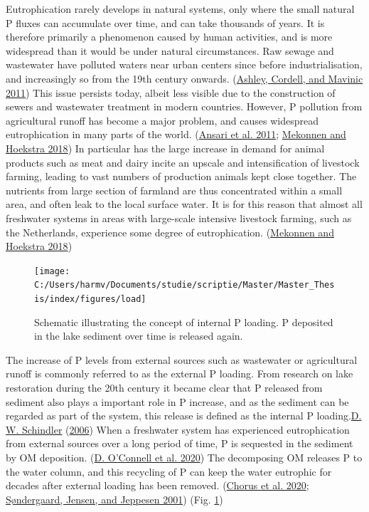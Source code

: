 \documentclass[a4paper,11pt]{article}
\begin{document}
Eutrophication rarely develops in natural systems, only where the small natural P fluxes can accumulate over time, and can take thousands of years. It is therefore primarily a phenomenon caused by human activities, and is more widespread than it would be under natural circumstances. Raw sewage and wastewater have polluted waters near urban centers since before industrialisation, and increasingly so from the 19th century onwards. (\protect\hyperlink{ref-ashleyBriefHistoryPhosphorus2011}{Ashley, Cordell, and Mavinic 2011}) This issue persists today, albeit less visible due to the construction of sewers and wastewater treatment in modern countries. However, P pollution from agricultural runoff has become a major problem, and causes widespread eutrophication in many parts of the world. (\protect\hyperlink{ref-ansariEutrophicationCausesConsequences2011}{Ansari et al. 2011}; \protect\hyperlink{ref-mekonnenGlobalAnthropogenicPhosphorus2018}{Mekonnen and Hoekstra 2018}) In particular has the large increase in demand for animal products such as meat and dairy incite an upscale and intensification of livestock farming, leading to vast numbers of production animals kept close together. The nutrients from large section of farmland are thus concentrated within a small area, and often leak to the local surface water. It is for this reason that almost all freshwater systems in areas with large-scale intensive livestock farming, such as the Netherlands, experience some degree of eutrophication. (\protect\hyperlink{ref-mekonnenGlobalAnthropogenicPhosphorus2018}{Mekonnen and Hoekstra 2018})
\begin{figure}

{\centering \texttt{[image: C:/Users/harmv/Documents/studie/scriptie/Master/Master\_Thesis/index/figures/load]} 

}

\caption{Schematic illustrating the concept of internal P loading. P deposited in the lake sediment over time is released again.}\label{fig:intern}
\end{figure}
The increase of P levels from external sources such as wastewater or agricultural runoff is commonly referred to as the external P loading. From research on lake restoration during the 20th century it became clear that P released from sediment also plays a important role in P increase, and as the sediment can be regarded as part of the system, this release is defined as the internal P loading.\protect\hyperlink{ref-schindlerRecentAdvancesUnderstanding2006}{D. W. Schindler} (\protect\hyperlink{ref-schindlerRecentAdvancesUnderstanding2006}{2006}) When a freshwater system has experienced eutrophication from external sources over a long period of time, P is sequested in the sediment by OM deposition. (\protect\hyperlink{ref-oconnellChangesSedimentaryPhosphorus2020}{D. O'Connell et al. 2020}) The decomposing OM releases P to the water column, and this recycling of P can keep the water eutrophic for decades after external loading has been removed. (\protect\hyperlink{ref-chorusDecadesNeededEcosystem2020}{Chorus et al. 2020}; \protect\hyperlink{ref-sondergaardRetentionInternalLoading2001}{Søndergaard, Jensen, and Jeppesen 2001}) (Fig. \ref{fig:intern})
\end{document}
